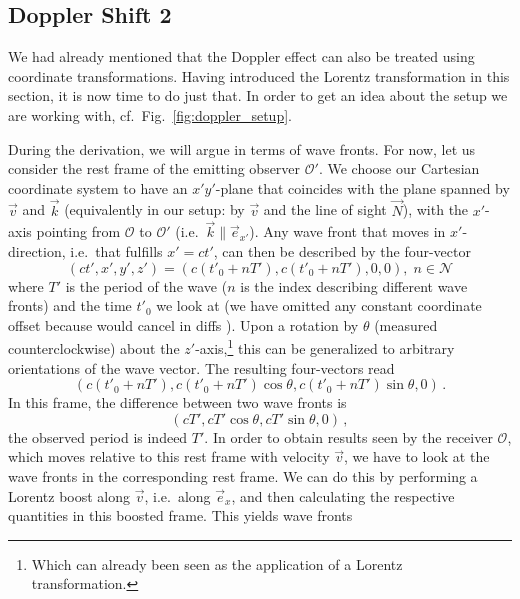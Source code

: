 \documentclass[../relativity_main.tex]{subfiles}
\begin{document}
		\subsection{Doppler Shift 2}
We had already mentioned that the Doppler effect can also be treated using coordinate transformations. Having introduced the Lorentz transformation in this section, it is now time to do just that. In order to get an idea about the setup we are working with, cf.~Fig.~\ref{fig:doppler_setup}.


During the derivation, we will argue in terms of wave fronts. For now, let us consider the rest frame of the emitting observer $\mathcal{O}'$. We choose our Cartesian coordinate system to have an $x' y'$-plane that coincides with the plane spanned by $\vec{v}$ and $\vec{k}$ (equivalently in our setup: by $\vec{v}$ and the line of sight $\vec{N}$), with the $x'$-axis pointing from $\mathcal{O}$ to $\mathcal{O}'$ (i.e.~$\vec{k} \parallel \vec{e}_{x'}$). Any wave front that moves in $x'$-direction, i.e.~that fulfills $x' = c t'$, can then be described by the four-vector
\begin{equation}
	(c t', x', y', z') = (c (t'_0 + n T'), c (t'_0 + n T'), 0, 0), \; n \in \mathcal{N}
\end{equation}
where $T'$ is the period of the wave ($n$ is the index describing different wave fronts) and the time $t'_0$ we look at (we have omitted any constant coordinate offset because would cancel in diffs ). Upon a rotation by $\theta$ (measured counterclockwise) about the $z'$-axis,\footnote{Which can already been seen as the application of a Lorentz transformation.} this can be generalized to arbitrary orientations of the wave vector. The resulting four-vectors read
\begin{equation}
	(c (t'_0 + n T'), c (t'_0 + n T') \cos \theta, c (t'_0 + n T') \sin \theta, 0) \, .
\end{equation}
In this frame, the difference between two wave fronts is
\begin{equation}
	(c T', c T' \cos \theta, c T' \sin \theta, 0) \, ,
\end{equation}
the observed period is indeed $T'$. In order to obtain results seen by the receiver $\mathcal{O}$, which moves relative to this rest frame with velocity $\vec{v}$, we have to look at the wave fronts in the corresponding rest frame. We can do this by performing a Lorentz boost along $\vec{v}$, i.e.~along $\vec{e}_x$, and then calculating the respective quantities in this boosted frame. This yields wave fronts
\end{document}
